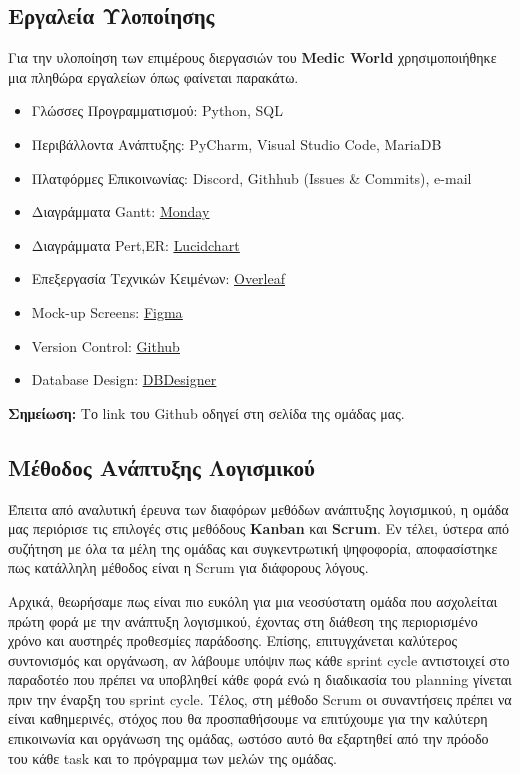 \documentclass{article}
\begin{document}
\subsection{Εργαλεία Υλοποίησης}

Για την υλοποίηση των επιμέρους διεργασιών του \textbf{Medic World} χρησιμοποιήθηκε μια πληθώρα εργαλείων όπως φαίνεται παρακάτω.


\begin{itemize}
    \item Γλώσσες Προγραμματισμού: Python, SQL
    \item Περιβάλλοντα Ανάπτυξης: PyCharm, Visual Studio Code, MariaDB
    \item Πλατφόρμες Επικοινωνίας: Discord, Githhub (Issues \& Commits), e-mail
    \item Διαγράμματα Gantt: \underline{\href{https://www.monday.com
}{Monday}}
    \item Διαγράμματα Pert,ER: \underline{\href{https://lucid.app
}{Lucidchart}}
    \item Επεξεργασία Τεχνικών Κειμένων: \underline{\href{https://www.overleaf.com
}{Overleaf}}
    \item Mock-up Screens: \underline{\href{https://www.figma.com
}{Figma}}
    \item Version Control: \underline{\href{https://github.com/mstephanidhs/Software-Engineering}{Github
}}
    \item Database Design: \underline{\href{www.dbdesigner.net
}{DBDesigner}}
\end{itemize}

\vspace{0.3cm}

\textbf{Σημείωση:} Το link του Github οδηγεί στη σελίδα της ομάδας μας.
 

\subsection{Μέθοδος Ανάπτυξης Λογισμικού}

Έπειτα από αναλυτική έρευνα των διαφόρων μεθόδων ανάπτυξης λογισμικού, η ομάδα μας περιόρισε τις επιλογές στις μεθόδους \textbf{Kanban} και \textbf{Scrum}. Εν τέλει, ύστερα από συζήτηση με όλα τα μέλη της ομάδας και συγκεντρωτική ψηφοφορία, αποφασίστηκε πως κατάλληλη μέθοδος είναι η Scrum για διάφορους λόγους. \newline \par

Αρχικά, θεωρήσαμε πως είναι πιο ευκόλη για μια νεοσύστατη ομάδα που ασχολείται πρώτη φορά με την ανάπτυξη λογισμικού, έχοντας στη διάθεση της περιορισμένο χρόνο και αυστηρές προθεσμίες παράδοσης. Επίσης, επιτυγχάνεται καλύτερος συντονισμός και οργάνωση, αν λάβουμε υπόψιν πως κάθε sprint cycle αντιστοιχεί στο παραδοτέο που πρέπει να υποβληθεί κάθε φορά ενώ η διαδικασία του planning γίνεται πριν την έναρξη του sprint cycle. Τέλος, στη μέθοδο Scrum οι συναντήσεις πρέπει να είναι καθημερινές, στόχος που θα προσπαθήσουμε να επιτύχουμε για την καλύτερη επικοινωνία και οργάνωση της ομάδας, ωστόσο αυτό θα εξαρτηθεί από την πρόοδο του κάθε task και το πρόγραμμα των μελών της ομάδας. \newline \par
\end{document}
